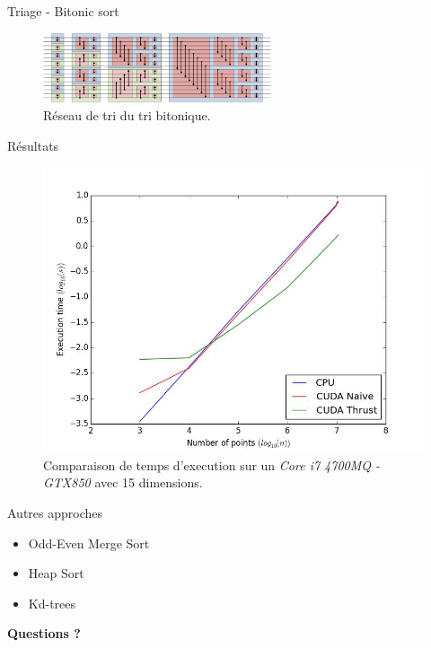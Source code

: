 \documentclass[12pt,a4paper]{beamer}
\begin{document}
\begin{frame}{Triage - Bitonic sort}
\begin{figure}[h]
\centering
\includegraphics[width=0.6\textwidth]{../figures/BitonicSort1.png}
\caption{\label{fig:BitonicSort}Réseau de tri du tri bitonique.}
\end{figure}
\end{frame}

\begin{frame}{Résultats}
\begin{figure}[h]
\centering
\includegraphics[scale=0.3]{../figures/comparison.jpg}
\caption{\label{fig:Comparaison}Comparaison de temps d'execution sur un \emph{Core i7 4700MQ - GTX850} avec 15 dimensions.}
\end{figure}
\end{frame}

\begin{frame}{Autres approches}
\begin{itemize}
\item Odd-Even Merge Sort
\item Heap Sort 
\item Kd-trees
\end{itemize}
\end{frame}

\begin{frame}
\begin{center}
\LARGE \textbf{Questions ?}
\end{center}
\end{frame}
\end{document}
